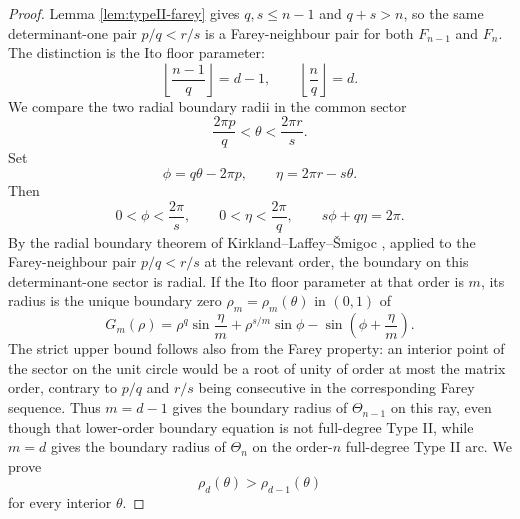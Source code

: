 \documentclass[11pt]{article}
\theoremstyle{definition}
\theoremstyle{remark}
\begin{document}
\begin{proof}
Lemma \ref{lem:typeII-farey} gives $q,s\le n-1$ and $q+s>n$, so the same determinant-one pair $p/q<r/s$ is a Farey-neighbour pair for both $F_{n-1}$ and $F_n$.  The distinction is the Ito floor parameter:
\[
        \left\lfloor\frac{n-1}{q}\right\rfloor=d-1,
        \qquad
        \left\lfloor\frac n q\right\rfloor=d .
\]
We compare the two radial boundary radii in the common sector
\[
        \frac{2\pi p}{q}<\theta<\frac{2\pi r}{s} .
\]
Set
\[
        \phi=q\theta-2\pi p,
        \qquad
        \eta=2\pi r-s\theta .
\]
Then
\[
        0<\phi<\frac{2\pi}{s},
        \qquad
        0<\eta<\frac{2\pi}{q},
        \qquad
        s\phi+q\eta=2\pi .
\]
By the radial boundary theorem of Kirkland--Laffey--\v Smigoc \cite[Theorem 1.2]{KirklandLaffeySmigoc2020}, applied to the Farey-neighbour pair $p/q<r/s$ at the relevant order, the boundary on this determinant-one sector is radial. If the Ito floor parameter at that order is $m$, its radius is the unique boundary zero $\rho_m=\rho_m(\theta)$ in $(0,1)$ of
\begin{equation}
        G_m(\rho)
        =
        \rho^q\sin\frac{\eta}{m}
        +
        \rho^{s/m}\sin\phi
        -
        \sin\left(\phi+\frac{\eta}{m}\right).
        \label{eq:radial-Gm}
\end{equation}
The strict upper bound follows also from the Farey property: an interior point of the sector on the unit circle would be a root of unity of order at most the matrix order, contrary to $p/q$ and $r/s$ being consecutive in the corresponding Farey sequence. Thus $m=d-1$ gives the boundary radius of $\Theta_{n-1}$ on this ray, even though that lower-order boundary equation is not full-degree Type II, while $m=d$ gives the boundary radius of $\Theta_n$ on the order-$n$ full-degree Type II arc. We prove
\[
        \rho_d(\theta)>\rho_{d-1}(\theta)
\]
for every interior $\theta$.


\end{proof}
\end{document}
